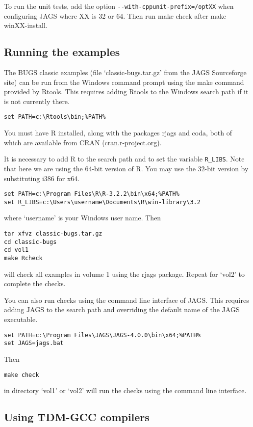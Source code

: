 \documentclass[11pt, a4paper, titlepage]{article}
\newcommand{\JAGS}{\textsf{JAGS}}
\newcommand{\R}{\textsf{R}}
\newcommand{\code}[1]{{\bgroup{\normalfont\ttfamily #1}\egroup}}
\newcommand{\file}[1]{{`\normalfont\textsf{#1}'}}
\let\command=\code
\begin{document}
To run the unit tests, add the option
\verb+--with-cppunit-prefix=/optXX+ when configuring JAGS where
\code{XX} is 32 or 64. Then run \code{make check} after \code{make
  winXX-install}.

\subsection{Running the examples}

The BUGS classic examples (file \file{classic-bugs.tar.gz} from the JAGS
Sourceforge site) can be run from the Windows command prompt using
the \command{make} command provided by Rtools. This requires adding Rtools
to the Windows search path if it is not currently there.
\begin{verbatim}
set PATH=c:\Rtools\bin;%PATH%
\end{verbatim}
You must have R installed, along with the packages \code{rjags} and
\code{coda}, both of which are available from CRAN
(\url{cran.r-project.org}).

It is necessary to add R to the search path and to set the variable
\verb+R_LIBS+. Note that here we are using the 64-bit version of R.
You may use the 32-bit version by substituting \code{i386} for
\code{x64}.
\begin{verbatim}
set PATH=c:\Program Files\R\R-3.2.2\bin\x64;%PATH%
set R_LIBS=c:\Users\username\Documents\R\win-library\3.2
\end{verbatim}
where \file{username} is your Windows user name. Then
\begin{verbatim}
tar xfvz classic-bugs.tar.gz
cd classic-bugs
cd vol1
make Rcheck
\end{verbatim}
will check all examples in volume 1 using the \code{rjags} package. Repeat
for \file{vol2} to complete the checks.

You can also run checks using the command line interface of JAGS. This
requires adding JAGS to the search path and overriding the default name
of the JAGS executable.
\begin{verbatim}
set PATH=c:\Program Files\JAGS\JAGS-4.0.0\bin\x64;%PATH%
set JAGS=jags.bat
\end{verbatim}
Then
\begin{verbatim}
make check
\end{verbatim}
in directory \file{vol1} or \file{vol2} will run the checks using the
command line interface.

\subsection{Using TDM-GCC compilers}
\end{document}
